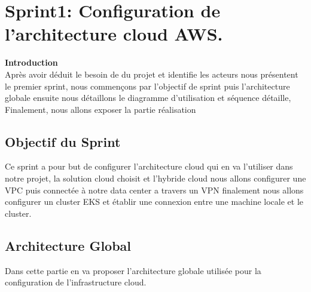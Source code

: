 \chapter{Sprint1: Configuration de l'architecture cloud AWS.}
\newpage
\textbf{\huge Introduction} \\[1cm]
\textsf{\selectfont{}
Après avoir déduit le besoin de du projet et identifie les acteurs nous présentent le premier sprint, nous commençons par l'objectif de sprint puis l'architecture globale ensuite nous détaillons le diagramme d'utilisation et séquence détaille, Finalement, nous allons exposer la partie réalisation}


\section{\LARGE Objectif du Sprint}
\textsf{\selectfont{}Ce sprint a pour but de configurer l'architecture cloud qui en va l'utiliser dans notre projet, la solution cloud choisit et l'hybride cloud nous allons configurer une VPC puis connectée à notre data center a travers un VPN finalement nous allons configurer un cluster EKS et établir une connexion entre une machine locale et le cluster.}


\section{\LARGE Architecture Global}
\textsf{\selectfont{}
Dans cette partie en va proposer l'architecture globale utilisée pour la configuration de l'infrastructure cloud. }


